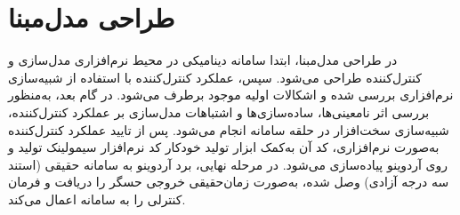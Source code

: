 \section{طراحی مدل‌مبنا}
در طراحی مدل‌مبنا، ابتدا سامانه دینامیكی در محیط نرم‌افزاری مدل‌سازی و کنترل‌کننده طراحی می‌شود. سپس،  عملكرد کنترل‌کننده با استفاده از شبیه‌سازی نرم‌افزاری بررسی شده و اشكالات اولیه موجود برطرف می‌شود. در گام بعد، به‌منظور بررسی اثر نامعینی‌ها، ساده‌سازی‌ها و اشتباهات مدل‌سازی بر عملكرد کنترل‌کننده، شبیه‌سازی سخت‌افزار در حلقه سامانه
انجام می‌شود. پس از تایید عملكرد کنترل‌کننده به‌صورت نرم‌افزاری، کد آن به‌کمک ابزار تولید خودکار کد نرم‌افزار سیمولینک تولید و روی آردوینو پیاده‌سازی می‌شود.
 در مرحله نهایی، برد آردوینو به سامانه حقیقی (استند سه درجه آزادی) وصل شده، به‌صورت
زمان‌حقیقی خروجی حسگر را دریافت و فرمان کنترلی را به سامانه اعمال می‌کند.
